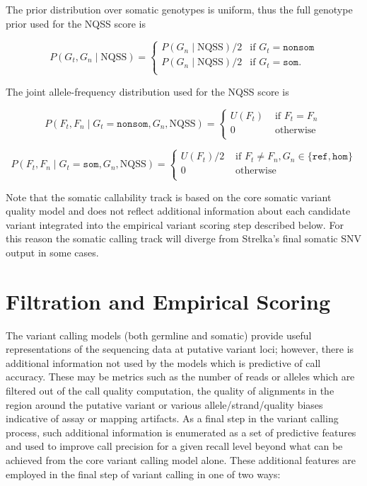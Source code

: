 \documentclass{article}
\begin{document}
The prior distribution over somatic genotypes is uniform, thus the full genotype prior used for the NQSS score is

\begin{equation*}
P(G_t, G_n \mid \text{NQSS}) =
\begin{cases}
P(G_n \mid \text{NQSS})/2 & \text{if } G_t = \texttt{nonsom} \\
P(G_n \mid \text{NQSS})/2 & \text{if } G_t = \texttt{som}. \\
\end{cases}
\end{equation*}


The joint allele-frequency distribution used for the NQSS score is

\begin{equation*}
P(F_t, F_n \mid G_t = \texttt{nonsom}, G_n, \text{NQSS})=
\begin{cases}
U(F_t) & \text{ if } F_t = F_n \\
0 & \text{ otherwise } \\
\end{cases}
\end{equation*}

\begin{equation*}
P(F_t, F_n \mid G_t = \texttt{som}, G_n, \text{NQSS})=
\begin{cases}
U(F_t)/2 & \text{ if } F_t \neq F_n, G_n \in \{\texttt{ref},\texttt{hom}\}  \\
0 & \text{ otherwise } \\
\end{cases}
\end{equation*}

Note that the somatic callability track is based on the core somatic variant quality model and does not reflect additional information about each candidate variant integrated into the empirical variant scoring step described below. For this reason the somatic calling track will diverge from Strelka's final somatic SNV output in some cases.



\section{Filtration and Empirical Scoring}

The variant calling models (both germline and somatic) provide useful representations of the sequencing data at putative variant loci; however, there is additional information not used by the models which is predictive of call accuracy. These may be metrics such as the number of reads or alleles which are filtered out of the call quality computation, the quality of alignments in the region around the putative variant or various allele/strand/quality biases indicative of assay or mapping artifacts. As a final step in the variant calling process, such additional information is enumerated as a set of predictive features and used to improve call precision for a given recall level beyond what can be achieved from the core variant calling model alone. These additional features are employed in the final step of variant calling in one of two ways:
\end{document}

